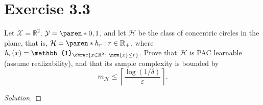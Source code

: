 \documentclass[10pt, a4paper, twoside]{amsart}
\newcommand{\R}{\ensuremath{\mathbb{R}}}
\DeclarePairedDelimiter\cbrac\{\}
\DeclarePairedDelimiter\paren()
\DeclarePairedDelimiter{\nrm}\lVert\rVert
\renewcommand{\c}{\ensuremath{\colon}}
\newcommand{\Ind}{\ensuremath{\mathbb{1}}}
\newenvironment{solution}
               {\let\oldqedsymbol=\qedsymbol
                \renewcommand{\qedsymbol}{$\blacktriangleleft$}
                \begin{proof}[Solution]}
               {\end{proof}
                \renewcommand{\qedsymbol}{\oldqedsymbol}}
\newcommand{\TODO}{\textcolor{red}{\textbf{!!!!!! }}}
\begin{document}
\section*{Exercise 3.3}
Let $\mathcal{X} = \R^2$, $\mathcal{Y} = \paren*{0,1}$, and let $\mathcal{H}$ be the class of concentric circles in the plane, that is, $\mathcal{H}=\paren*{h_r:r \in \R_+}$, where $h_r(x) = \Ind_{\cbrac{x \in \R^2\c\nrm{x} \leq r}}$. Prove that $\mathcal{H}$ is PAC learnable (assume realizability), and that its sample complexity is bounded by
\begin{equation*}
  m_{\mathcal{H}}\leq \left\lceil \frac{\log(1/\delta )}{\varepsilon} \right\rceil .
\end{equation*}
\begin{solution}

  

\end{solution}
\end{document}
